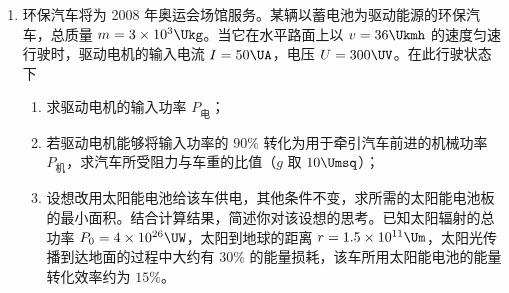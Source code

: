 \documentclass[\gkver]{gaokaozhenti}
\begin{document}
\begin{enumerate}
{（2）$\alpha$ 粒子带两个单位正电荷，电荷量 $q=2e$，质量 $m'=4m$。由牛顿第二定律，$\alpha$ 粒子在极板间运动的加速度 $a=\frac{qE}{m'}=\frac{2eU}{4md}=\frac{eU}{2md}$。

（3）$\alpha$ 粒子垂直于电场方向射入，在极板间做类平抛运动。沿电场方向有 $d=\frac{1}{2}at^{2}$，得 $t=\sqrt{\frac{2d}{a}}=2d\sqrt{\frac{m}{eU}}$；沿初速度方向有 $R=v_{0}t$，所以 $v_{0}=\frac{R}{t}=\frac{R}{2d}\sqrt{\frac{eU}{m}}$。
}

\item
环保汽车将为 2008 年奥运会场馆服务。某辆以蓄电池为驱动能源的环保汽车，总质量 $m=3\times10^{3}\Ukg$。当它在水平路面上以 $v=36\Ukmh$ 的速度匀速行驶时，驱动电机的输入电流 $I=50\UA$，电压 $U=300\UV$。在此行驶状态下

\begin{enumerate}
	\item
	求驱动电机的输入功率 $P_{\text{电}}$；
	\item
	若驱动电机能够将输入功率的 $90\%$ 转化为用于牵引汽车前进的机械功率 $P_{\text{机}}$，求汽车所受阻力与车重的比值（$g$ 取 $10\Umsq$）；
	\item
	设想改用太阳能电池给该车供电，其他条件不变，求所需的太阳能电池板的最小面积。结合计算结果，简述你对该设想的思考。已知太阳辐射的总功率 $P_{0}=4\times10^{26}\UW$，太阳到地球的距离 $r=1.5\times10^{11}\Um$，太阳光传播到达地面的过程中大约有 $30\%$ 的能量损耗，该车所用太阳能电池的能量转化效率约为 $15\%$。
\end{enumerate}



\end{enumerate}
\end{document}
